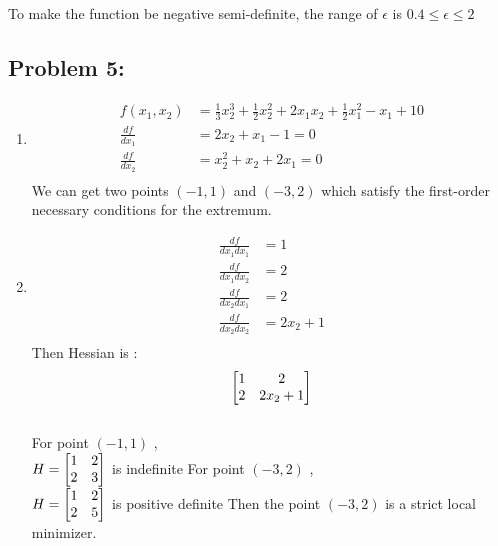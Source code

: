\documentclass{article}
\begin{document}
To make the function be negative semi-definite, the range of $\epsilon$ is $ 0.4 \leq \epsilon \leq 2 $ 

\subsection*{Problem 5: } 
\begin{enumerate} 
\item
\begin{align*}
f(x_1, x_2) & = \frac{1}{3}x_2^3 + \frac{1}{2}x_2^2 + 2x_1x_2 + \frac{1}{2}x_1^2-x_1+10 \\
\frac{df}{dx_1} &= 2x_2 + x_1 -1 = 0 \\
\frac{df}{dx_2} &= x_2^2 +x_2 + 2x_1 = 0 \\
\end{align*} 
We can get two points $(-1, 1)$ and $(-3, 2)$ which satisfy the first-order necessary conditions for the extremum. \\
\item 
\begin{align*} 
\frac{df}{dx_1dx_1} &= 1 \\
\frac{df}{dx_1dx_2} &=  2 \\
\frac{df}{dx_2dx_1} &= 2 \\
\frac{df}{dx_2dx_2} &= 2x_2 + 1 \\
\end{align*}
Then Hessian is : \begin{align*} \begin{bmatrix} 1 & 2 \\ 2 & 2x_2 + 1 \end{bmatrix} \end{align*} \\
For point $(-1, 1)$ , \\
$H = \begin{bmatrix} 1 & 2 \\ 2 & 3 \end{bmatrix} $  is indefinite
For point $(-3, 2) $ , \\
$H = \begin{bmatrix} 1 & 2 \\ 2 & 5 \end{bmatrix} $ is positive definite
Then the point $(-3, 2)$ is a strict local minimizer. 

\end{enumerate} 
\end{document}
